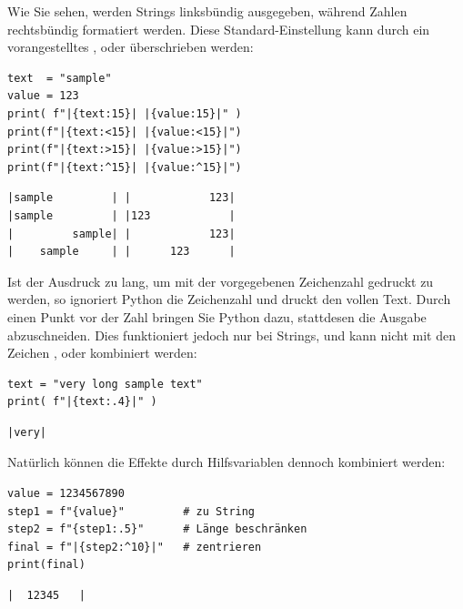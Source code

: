 Wie Sie sehen, werden Strings linksbündig ausgegeben, während Zahlen rechtsbündig formatiert werden. Diese Standard-Einstellung kann durch ein vorangestelltes \inPy{<}, \inPy{>} oder \inPy{^} überschrieben werden:
\begin{codebox}
\begin{verbatim}
text  = "sample"
value = 123
print( f"|{text:15}| |{value:15}|" )
print(f"|{text:<15}| |{value:<15}|")
print(f"|{text:>15}| |{value:>15}|")
print(f"|{text:^15}| |{value:^15}|")
\end{verbatim}
\end{codebox}
\begin{cmdbox}
\begin{verbatim}
|sample         | |            123|
|sample         | |123            |
|         sample| |            123|
|    sample     | |      123      |
\end{verbatim}
\end{cmdbox}

Ist der Ausdruck zu lang, um mit der vorgegebenen Zeichenzahl gedruckt zu werden, so ignoriert Python die Zeichenzahl und druckt den vollen Text. Durch einen Punkt vor der Zahl bringen Sie Python dazu, stattdesen die Ausgabe abzuschneiden. Dies funktioniert jedoch nur bei Strings, und kann nicht mit den Zeichen \inPy{<}, \inPy{>} oder \inPy{^} kombiniert werden:
\begin{codebox}
\begin{verbatim}
text = "very long sample text"
print( f"|{text:.4}|" )
\end{verbatim}
\end{codebox}
\begin{cmdbox}
\begin{verbatim}
|very|
\end{verbatim}
\end{cmdbox}

Natürlich können die Effekte durch Hilfsvariablen dennoch kombiniert werden:
\begin{codebox}
\begin{verbatim}
value = 1234567890
step1 = f"{value}"         # zu String
step2 = f"{step1:.5}"      # Länge beschränken
final = f"|{step2:^10}|"   # zentrieren
print(final)
\end{verbatim}
\end{codebox}
\begin{cmdbox}
\begin{verbatim}
|  12345   |
\end{verbatim}
\end{cmdbox}

